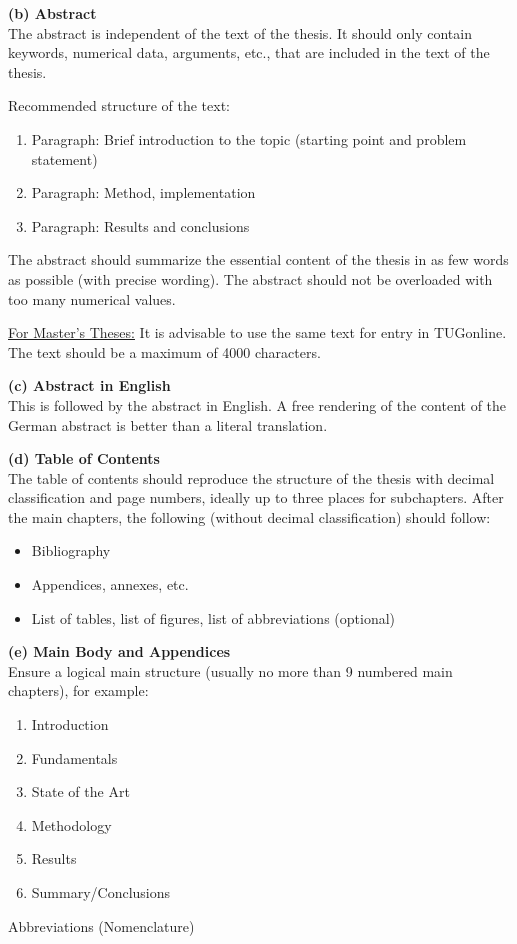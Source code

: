 \documentclass[a4paper, fleqn, headsepline, footsepline, 12pt, parskip=half]{scrartcl}
\begin{document}
\textbf{(b) Abstract} \\
The abstract is independent of the text of the thesis. It should only contain keywords, numerical data, arguments, etc., that are included in the text of the thesis.

Recommended structure of the text:
\begin{enumerate}
    \item Paragraph: Brief introduction to the topic (starting point and problem statement)
    \item Paragraph: Method, implementation
    \item Paragraph: Results and conclusions
\end{enumerate}

The abstract should summarize the essential content of the thesis in as few words as possible (with precise wording). The abstract should not be overloaded with too many numerical values.

\underline{For Master's Theses:} It is advisable to use the same text for entry in TUGonline. The text should be a maximum of \num{4000} characters.

\textbf{(c) Abstract in English} \\
This is followed by the abstract in English. A free rendering of the content of the German abstract is better than a literal translation.

\textbf{(d) Table of Contents} \\
The table of contents should reproduce the structure of the thesis with decimal classification and page numbers, ideally up to three places for subchapters. After the main chapters, the following (without decimal classification) should follow:

\begin{itemize}
    \item Bibliography
    \item Appendices, annexes, etc.
    \item List of tables, list of figures, list of abbreviations (optional)
\end{itemize}

\textbf{(e) Main Body and Appendices} \\
Ensure a logical main structure (usually no more than 9 numbered main chapters), for example:

\begin{enumerate}
    \item Introduction
    \item Fundamentals
    \item State of the Art
    \item Methodology
    \item Results
    \item Summary/Conclusions
\end{enumerate}
\hspace{5mm}
Abbreviations (Nomenclature)
\end{document}
